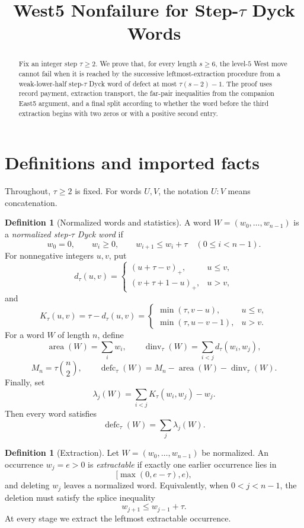 \documentclass[11pt]{article}
\title{West5 Nonfailure for Step-$\tau$ Dyck Words}
\author{}
\date{}
\theoremstyle{definition}
\newtheorem{definition}[theorem]{Definition}
\theoremstyle{remark}
\newcommand{\area}{\operatorname{area}}
\newcommand{\dinv}{\operatorname{dinv}}
\newcommand{\defc}{\operatorname{defc}}
\begin{document}
\maketitle

\begin{abstract}
Fix an integer step $\tau\ge2$.  We prove that, for every length
$s\ge6$, the level-$5$ West move cannot fail when it is reached by the
successive leftmost-extraction procedure from a weak-lower-half
step-$\tau$ Dyck word of defect at most $\tau(s-2)-1$.  The proof uses
record payment, extraction transport, the far-pair inequalities from the
companion East5 argument, and a final split according to whether the word
before the third extraction begins with two zeros or with a positive
second entry.
\end{abstract}

\section{Definitions and imported facts}

Throughout, $\tau\ge2$ is fixed.  For words $U,V$, the notation $U:V$
means concatenation.

\begin{definition}[Normalized words and statistics]
A word $W=(w_0,\ldots,w_{n-1})$ is a \emph{normalized step-$\tau$ Dyck
word} if
\[
 w_0=0,\qquad w_i\ge0,\qquad w_{i+1}\le w_i+\tau
 \quad(0\le i<n-1).
\]
For nonnegative integers $u,v$, put
\[
 d_\tau(u,v)=
 \begin{cases}
  (u+\tau-v)_+,&u\le v,\\[1mm]
  (v+\tau+1-u)_+,&u>v,
 \end{cases}
\]
and
\[
 K_\tau(u,v)=\tau-d_\tau(u,v)
 =
 \begin{cases}
  \min(\tau,v-u),&u\le v,\\[1mm]
  \min(\tau,u-v-1),&u>v.
 \end{cases}
\]
For a word $W$ of length $n$, define
\[
 \area(W)=\sum_iw_i,
 \qquad
 \dinv_\tau(W)=\sum_{i<j}d_\tau(w_i,w_j),
\]
\[
 M_n=\tau\binom n2,
 \qquad
 \defc_\tau(W)=M_n-\area(W)-\dinv_\tau(W).
\]
Finally, set
\[
 \lambda_j(W)=\sum_{i<j}K_\tau(w_i,w_j)-w_j.
\]
Then every word satisfies
\begin{equation}
 \defc_\tau(W)=\sum_j\lambda_j(W).
 \label{eq:lambda-identity}
\end{equation}
\end{definition}

\begin{definition}[Extraction]
Let $W=(w_0,\ldots,w_{n-1})$ be normalized.  An occurrence
$w_j=e>0$ is \emph{extractable} if exactly one earlier occurrence lies
in
\[
 [\max(0,e-\tau),e),
\]
and deleting $w_j$ leaves a normalized word.  Equivalently, when
$0<j<n-1$, the deletion must satisfy the splice inequality
\[
 w_{j+1}\le w_{j-1}+\tau.
\]
At every stage we extract the leftmost extractable occurrence.
\end{definition}
\end{document}

